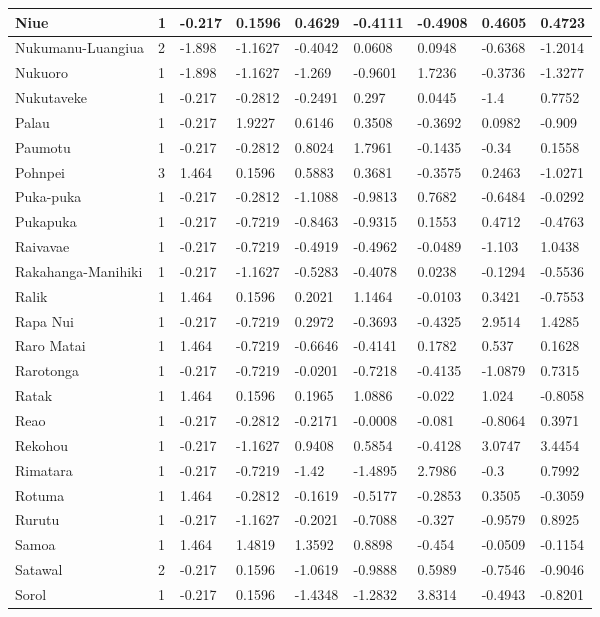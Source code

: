 \documentclass[draft,10pt]{article} %
\begin{document}
\begin{landscape}
\begin{longtable}{| p{2.6cm} |  p{1cm} | p{1.2cm}  | p{1.9cm}  | p{1.7cm}  | p{1.7cm}  | p{1.7cm}  | p{1.6cm} | p{1.5cm}   |}
Niue&1&-0.217&0.1596&0.4629&-0.4111&-0.4908&0.4605&0.4723\\ \hline
Nukumanu-Luangiua&2&-1.898&-1.1627&-0.4042&0.0608&0.0948&-0.6368&-1.2014\\ \hline
Nukuoro&1&-1.898&-1.1627&-1.269&-0.9601&1.7236&-0.3736&-1.3277\\ \hline
Nukutaveke&1&-0.217&-0.2812&-0.2491&0.297&0.0445&-1.4&0.7752\\ \hline
Palau&1&-0.217&1.9227&0.6146&0.3508&-0.3692&0.0982&-0.909\\ \hline
Paumotu&1&-0.217&-0.2812&0.8024&1.7961&-0.1435&-0.34&0.1558\\ \hline
Pohnpei&3&1.464&0.1596&0.5883&0.3681&-0.3575&0.2463&-1.0271\\ \hline
Puka-puka&1&-0.217&-0.2812&-1.1088&-0.9813&0.7682&-0.6484&-0.0292\\ \hline
Pukapuka&1&-0.217&-0.7219&-0.8463&-0.9315&0.1553&0.4712&-0.4763\\ \hline
Raivavae&1&-0.217&-0.7219&-0.4919&-0.4962&-0.0489&-1.103&1.0438\\ \hline
Rakahanga-Manihiki&1&-0.217&-1.1627&-0.5283&-0.4078&0.0238&-0.1294&-0.5536\\ \hline
Ralik&1&1.464&0.1596&0.2021&1.1464&-0.0103&0.3421&-0.7553\\ \hline
Rapa Nui&1&-0.217&-0.7219&0.2972&-0.3693&-0.4325&2.9514&1.4285\\ \hline
Raro Matai&1&1.464&-0.7219&-0.6646&-0.4141&0.1782&0.537&0.1628\\ \hline
Rarotonga&1&-0.217&-0.7219&-0.0201&-0.7218&-0.4135&-1.0879&0.7315\\ \hline
Ratak&1&1.464&0.1596&0.1965&1.0886&-0.022&1.024&-0.8058\\ \hline
Reao&1&-0.217&-0.2812&-0.2171&-0.0008&-0.081&-0.8064&0.3971\\ \hline
Rekohou&1&-0.217&-1.1627&0.9408&0.5854&-0.4128&3.0747&3.4454\\ \hline
Rimatara&1&-0.217&-0.7219&-1.42&-1.4895&2.7986&-0.3&0.7992\\ \hline
Rotuma&1&1.464&-0.2812&-0.1619&-0.5177&-0.2853&0.3505&-0.3059\\ \hline
Rurutu&1&-0.217&-1.1627&-0.2021&-0.7088&-0.327&-0.9579&0.8925\\ \hline
Samoa&1&1.464&1.4819&1.3592&0.8898&-0.454&-0.0509&-0.1154\\ \hline
Satawal&2&-0.217&0.1596&-1.0619&-0.9888&0.5989&-0.7546&-0.9046\\ \hline
Sorol&1&-0.217&0.1596&-1.4348&-1.2832&3.8314&-0.4943&-0.8201\\ \hline

\end{longtable}
\end{landscape}
\end{document}
